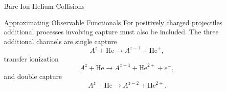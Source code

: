 \documentclass[a5paper, 9 pt]{extreport}
\begin{document}
\begin{chapter}{Bare Ion-Helium Collisions \label{chap:p-he2p-he}}
\begin{section}{Approximating Observable Functionals \label{sec:phe2p-obs}}
      For positively charged projectiles additional processes involving capture must also be included.
      The three additional channels are single capture
      \begin{equation} \label{eq:TP}
         A^z + \mathrm{He} \rightarrow A^{z-1} + \mathrm{He}^{+},
      \end{equation}
      transfer ionization
      \begin{equation} \label{eq:IP}
         A^z + \mathrm{He} \rightarrow A^{z-1} + \mathrm{He}^{2+} + e^-,
      \end{equation}
      and double capture
      \begin{equation} \label{eq:PP}
         A^z + \mathrm{He} \rightarrow A^{z-2} + \mathrm{He}^{2+}.
      \end{equation}


\end{section}
\end{chapter}
\end{document}
